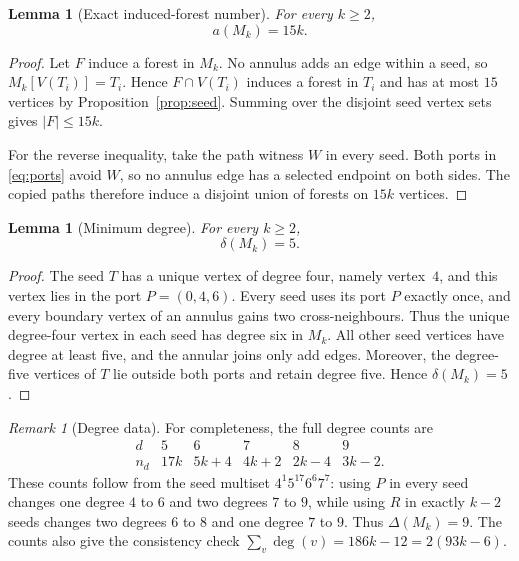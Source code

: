 \documentclass[11pt]{article}
\newtheorem{lemma}[theorem]{Lemma}
\theoremstyle{definition}
\theoremstyle{remark}
\newtheorem{remark}[theorem]{Remark}
\begin{document}
\begin{lemma}[Exact induced-forest number]\label{lem:familyforest}
For every $k\ge2$,
\[
 a(M_k)=15k.
\]
\end{lemma}

\begin{proof}
Let $F$ induce a forest in $M_k$.  No annulus adds an edge within a seed, so
$M_k[V(T_i)]=T_i$.  Hence $F\cap V(T_i)$ induces a forest in $T_i$ and has at
most $15$ vertices by Proposition~\ref{prop:seed}.  Summing over the disjoint
seed vertex sets gives $|F|\le15k$.

For the reverse inequality, take the path witness $W$ in every seed.  Both
ports in \eqref{eq:ports} avoid $W$, so no annulus edge has a selected
endpoint on both sides.  The copied paths therefore induce a disjoint union
of forests on $15k$ vertices.
\end{proof}

\begin{lemma}[Minimum degree]\label{lem:mindegree}
For every $k\ge2$,
\[
 \delta(M_k)=5.
\]
\end{lemma}

\begin{proof}
The seed $T$ has a unique vertex of degree four, namely vertex~$4$, and this
vertex lies in the port $P=(0,4,6)$.  Every seed uses its port $P$ exactly once,
and every boundary vertex of an annulus gains two cross-neighbours.  Thus the
unique degree-four vertex in each seed has degree six in $M_k$.  All other seed
vertices have degree at least five, and the annular joins only add edges.
Moreover, the degree-five vertices of $T$ lie outside both ports and retain
degree five.  Hence $\delta(M_k)=5$.
\end{proof}

\begin{remark}[Degree data]\label{rem:degrees}
For completeness, the full degree counts are
\[
\begin{array}{c|rrrrr}
d&5&6&7&8&9\\ \hline
n_d&17k&5k+4&4k+2&2k-4&3k-2.
\end{array}
\]
These counts follow from the seed multiset $4^1 5^{17}6^6 7^7$: using $P$ in
every seed changes one degree $4$ to $6$ and two degrees $7$ to $9$, while
using $R$ in exactly $k-2$ seeds changes two degrees $6$ to $8$ and one degree
$7$ to $9$.  Thus $\Delta(M_k)=9$.  The counts also give the consistency check
$\sum_v\deg(v)=186k-12=2(93k-6)$.
\end{remark}
\end{document}
